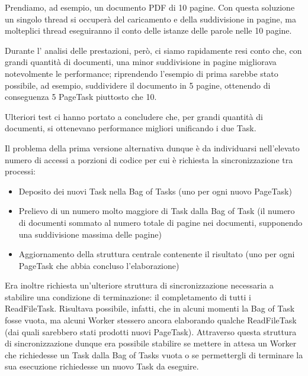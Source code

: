 \noindent Prendiamo, ad esempio, un documento PDF di 10 pagine. Con questa soluzione un singolo thread si occuperà del caricamento e della suddivisione in pagine, ma molteplici thread eseguiranno il conto delle istanze delle parole nelle 10 pagine.\newline

\noindent Durante l' analisi delle prestazioni, però, ci siamo rapidamente resi conto che, con grandi quantità di documenti, una minor suddivisione in pagine migliorava notevolmente le performance; riprendendo l'esempio di prima sarebbe stato possibile, ad esempio, suddividere il documento in 5 pagine, ottenendo di conseguenza 5 PageTask piuttosto che 10.\newline

\noindent Ulteriori test ci hanno portato a concludere che, per grandi quantità di documenti, si ottenevano performance migliori unificando i due Task.\newline

\noindent Il problema della prima versione alternativa dunque è da individuarsi nell'elevato numero di accessi a porzioni di codice per cui è richiesta la sincronizzazione tra processi:
\begin{itemize}
    \item Deposito dei nuovi Task nella Bag of Tasks (uno per ogni nuovo PageTask)
    \item Prelievo di un numero molto maggiore di Task dalla Bag of Task (il numero di documenti sommato al numero totale di pagine nei documenti, supponendo una suddivisione massima delle pagine)
    \item Aggiornamento della struttura centrale contenente il risultato (uno per ogni PageTask che abbia concluso l'elaborazione)
\end{itemize}

\noindent Era inoltre richiesta un'ulteriore struttura di sincronizzazione necessaria a stabilire una condizione di terminazione: il completamento di tutti i ReadFileTask.
Risultava possibile, infatti, che in alcuni momenti la Bag of Task fosse vuota, ma alcuni Worker stessero ancora elaborando qualche ReadFileTask (dai quali sarebbero stati prodotti nuovi PageTask). Attraverso questa struttura di sincronizzazione dunque era possibile stabilire se mettere in attesa un Worker che richiedesse un Task dalla Bag of Tasks vuota o se permettergli di terminare la sua esecuzione richiedesse un nuovo Task da eseguire.\newline

